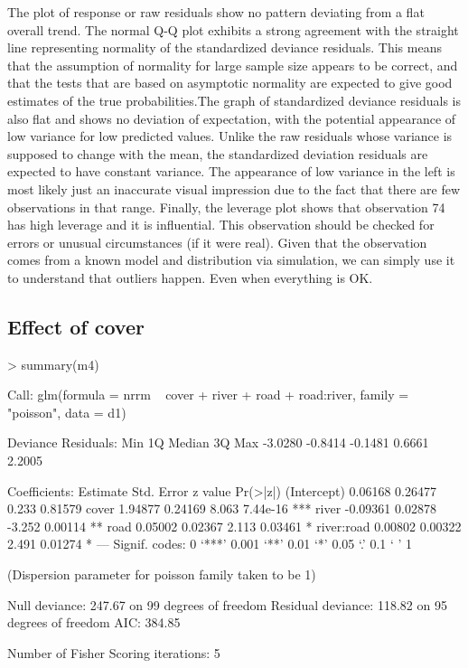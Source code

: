 \documentclass{article}
\begin{document}
The plot of response or raw residuals show no pattern deviating from a flat overall trend. The normal Q-Q plot exhibits a strong agreement with the straight line representing normality of the standardized deviance residuals. This means that the assumption of normality for large sample size appears to be correct, and that the tests that are based on asymptotic normality are expected to give good estimates of the true probabilities.The graph of standardized deviance residuals is also flat and shows no deviation of expectation, with the potential appearance of low variance for low predicted values. Unlike the raw residuals whose variance is supposed to change with the mean, the standardized deviation residuals are expected to have constant variance. The appearance of low variance in the left is most likely just an inaccurate visual impression due to the fact that there are few observations in that range. Finally, the leverage plot shows that observation 74 has high leverage and it is influential. This observation should be checked for errors or unusual circumstances (if it were real). Given that the observation comes from a known model and distribution via simulation, we can simply use it to understand that outliers happen. Even when everything is OK.

\subsection{Effect of cover}

\begin{Schunk}
\begin{Sinput}
> summary(m4)
\end{Sinput}
\begin{Soutput}
Call:
glm(formula = nrrm ~ cover + river + road + road:river, family = "poisson", 
    data = d1)

Deviance Residuals: 
    Min       1Q   Median       3Q      Max  
-3.0280  -0.8414  -0.1481   0.6661   2.2005  

Coefficients:
            Estimate Std. Error z value Pr(>|z|)    
(Intercept)  0.06168    0.26477   0.233  0.81579    
cover        1.94877    0.24169   8.063 7.44e-16 ***
river       -0.09361    0.02878  -3.252  0.00114 ** 
road         0.05002    0.02367   2.113  0.03461 *  
river:road   0.00802    0.00322   2.491  0.01274 *  
---
Signif. codes:  0 ‘***’ 0.001 ‘**’ 0.01 ‘*’ 0.05 ‘.’ 0.1 ‘ ’ 1

(Dispersion parameter for poisson family taken to be 1)

    Null deviance: 247.67  on 99  degrees of freedom
Residual deviance: 118.82  on 95  degrees of freedom
AIC: 384.85

Number of Fisher Scoring iterations: 5
\end{Soutput}
\end{Schunk}
\end{document}

